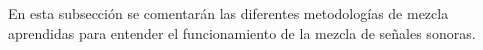 En esta subsección se comentarán las diferentes metodologías de mezcla aprendidas para entender el funcionamiento de la mezcla de señales sonoras.